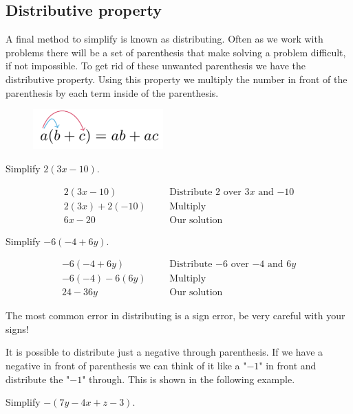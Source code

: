 \subsection{Distributive property}
A final method to simplify is known as distributing. Often as we work with problems there will be a set of parenthesis that make solving a problem difficult, if not impossible. To get rid of these unwanted parenthesis we have the distributive property. Using this property we multiply the number in front of the parenthesis by each term inside of the parenthesis.
\begin{figure}[ht]
	\centering
	\includegraphics[width=5cm]{pics/distributive}
\end{figure}
\begin{exa}
	Simplify $2(3x-10)$.
\end{exa}
\vspace{-0.4cm}
\begin{align*}
	2(3x-10)& &&\text{Distribute $2$ over $3x$ and $-10$}\\
	2(3x)+2(-10)& &&\text{Multiply}\\
	6x-20&	&&\text{Our solution}
\end{align*}
\vspace{0.4cm}
\begin{exa}
	Simplify $-6(-4+6y)$.
\end{exa}
\begin{align*}
	-6(-4+6y)& &&\text{Distribute $-6$ over $-4$ and $6y$}\\
	-6(-4)-6(6y)& &&\text{Multiply}\\
	24-36y&	&&\text{Our solution}
\end{align*}
\begin{nt}
	The most common error in distributing is a sign error, be very
careful with your signs!
\end{nt}
\begin{nt}
	It is possible to distribute just a negative through parenthesis. If we have a negative in front of parenthesis we can think of it like a "$−1$" in front and distribute the "$-1$" through. This is shown in the following example.
\end{nt}
\begin{exa}
	Simplify $-(7y-4x+z-3)$.
\end{exa}
